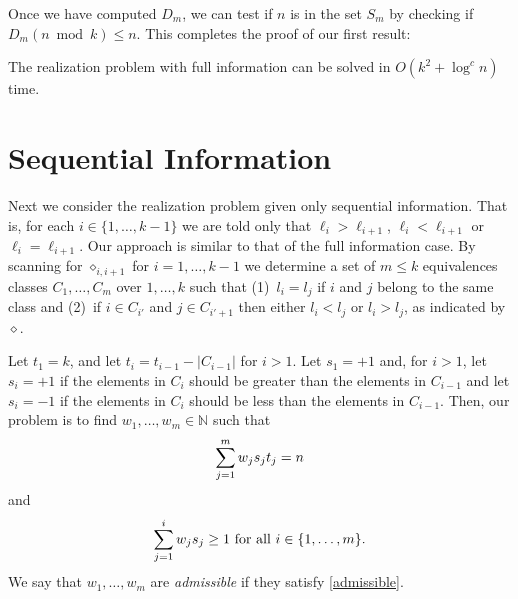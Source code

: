 \documentclass[11pt]{patmorin}
\newcommand{\N}{\mathbb{N}}
\newcommand{\op}{\diamond}
\begin{document}
Once we have computed $D_{m}$, we can test if $n$ is in the set $S_m$ by
checking if $D_m(n\bmod k) \le n$.  This completes the proof of our
first result:

\begin{thm}
The realization problem with full information can be solved in
$O(k^2+\log^c n)$ time.
\end{thm}



\section{Sequential Information}

Next we consider the realization problem given only sequential
information.  That is, for each $i\in\{1,\ldots,k-1\}$ we are told
only that $\ell_i > \ell_{i+1}$, $\ell_i < \ell_{i+1}$ or
$\ell_i=\ell_{i+1}$.  Our approach is similar to that of the full
information case.  By scanning for $\op_{i,i+1}$ for $i=1,\ldots,k-1$
we determine a set of $m\le k$ equivalences classes $C_1,\ldots,C_m$
over $1,\ldots,k$ such that (1)~$l_i=l_j$ if $i$ and $j$ belong to the
same class and (2)~if $i\in C_{i'}$ and $j\in C_{i'+1}$ then either
$l_i<l_j$ or $l_i > l_j$, as indicated by $\op$. 

Let $t_1=k$, and let $t_i = t_{i-1}-|C_{i-1}|$ for $i>1$.  Let
$s_1=+1$ and, for $i>1$, let $s_i=+1$ if the elements in $C_{i}$
should be greater than the elements in $C_{i-1}$ and let $s_{i}=-1$ if
the elements in $C_{i}$ should be less than the elements in $C_{i-1}$.
Then, our problem is to find $w_1,\ldots,w_m\in\N$ such
that
\begin{equation}
\sum_{j=1}^m w_js_jt_j = n \eqlabel{sum-n}
\end{equation}
and
\begin{equation}
\sum_{j=1}^i w_js_j \ge 1 \mbox{ for all $i\in\{1,\ldots,m\}$.}
\eqlabel{admissible}
\end{equation}
We say that $w_1,\ldots,w_m$ are \emph{admissible} if they satisfy
\eqref{admissible}.
\end{document}
